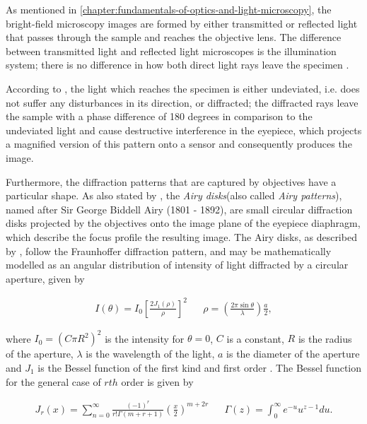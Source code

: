 As mentioned in \autoref{chapter:fundamentals-of-optics-and-light-microscopy}, the bright-field microscopy images are formed by either transmitted or reflected light that passes through the sample and reaches the objective lens. The difference between transmitted light and reflected light microscopes is the illumination system; there is no difference in how both direct light rays leave the specimen \cite{leng2009materials}.

According to , the light which reaches the specimen is either undeviated, i.e. does not suffer any disturbances in its direction, or diffracted; the diffracted rays leave the sample with a phase difference of 180 degrees in comparison to the undeviated light and cause destructive interference in the eyepiece, which projects a magnified version of this pattern onto a sensor and consequently produces the image.

Furthermore, the diffraction patterns that are captured by objectives have a particular shape. As also stated by , the \emph{Airy disks}(also called \emph{Airy patterns}), named after Sir George Biddell Airy (1801 - 1892), are small circular diffraction disks projected by the objectives onto the image plane of the eyepiece diaphragm, which describe the focus profile the resulting image. The Airy disks, as described by , follow the Fraunhoffer diffraction pattern, and may be mathematically modelled as an angular distribution of intensity of light diffracted by a circular aperture, given by

\begin{align}
\label{eqn:airy_function}
I(\theta) = I_{0} 
            \left[ 
            \frac{2 J_{1} (\rho)}{\rho}
            \right]^{2}
&&
\rho = \left( 
        \frac{2 \pi \sin{\theta}}{\lambda}
        \right) \frac{a}{2},
\end{align}

\noindent where $I_{0} = (C \pi R^{2})^{2}$ is the intensity for $\theta = 0$, $C$ is a constant, $R$ is the radius of the aperture, $\lambda$ is the wavelength of the light, $a$ is the diameter of the aperture and $J_{1}$ is the Bessel function of the first kind and first order \cite{mathews1970mathematical}. The Bessel function for the general case of $rth$ order is given by

\begin{align}
\label{eqn:1st_bessel}
J_{r}(x) = \sum_{n = 0}^{\infty}
            \frac{(-1)^{r}}
                 {r! \Gamma(m + r + 1)}
            \left(
                \frac{x}{2}
            \right)^{m + 2r}
&&
\Gamma(z) = \int_{0}^{\infty} e^{-u} u^{z-1}du.
\end{align}

